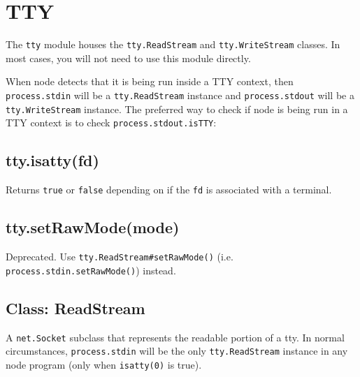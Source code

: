 \section{TTY}

\begin{Shaded}
\begin{Highlighting}[]
\NormalTok{: } 
\end{Highlighting}
\end{Shaded}

The \texttt{tty} module houses the \texttt{tty.ReadStream} and
\texttt{tty.WriteStream} classes. In most cases, you will not need to
use this module directly.

When node detects that it is being run inside a TTY context, then
\texttt{process.stdin} will be a \texttt{tty.ReadStream} instance and
\texttt{process.stdout} will be a \texttt{tty.WriteStream} instance. The
preferred way to check if node is being run in a TTY context is to check
\texttt{process.stdout.isTTY}:

\begin{Shaded}
\begin{Highlighting}[]
 
\end{Highlighting}
\end{Shaded}

\subsection{tty.isatty(fd)}

Returns \texttt{true} or \texttt{false} depending on if the \texttt{fd}
is associated with a terminal.

\subsection{tty.setRawMode(mode)}

Deprecated. Use \texttt{tty.ReadStream\#setRawMode()} (i.e.
\texttt{process.stdin.setRawMode()}) instead.

\subsection{Class: ReadStream}

A \texttt{net.Socket} subclass that represents the readable portion of a
tty. In normal circumstances, \texttt{process.stdin} will be the only
\texttt{tty.ReadStream} instance in any node program (only when
\texttt{isatty(0)} is true).


